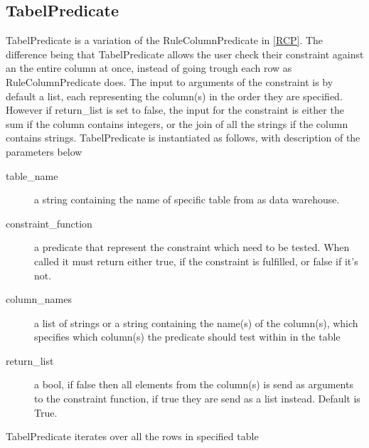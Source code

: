 \subsection{TabelPredicate}
TabelPredicate is a variation of the RuleColumnPredicate in \cref{RCP}. The difference being that TabelPredicate allows the user check their constraint against an the entire column at once, instead of going trough each row as RuleColumnPredicate does. The input to arguments of the constraint is by default a list, each representing the column(s) in the order they are specified. However if return\_list is set to false, the input for the constraint is either the sum if the column contains integers, or the join of all the strings if the column contains strings. TabelPredicate is instantiated as follows, with description of the parameters below


\begin{description}
\item [table\_name] a string containing the name of specific table from as data warehouse. 
\item [constraint\_function] a predicate that represent the constraint which need to be tested. When called it must return either true, if the constraint is fulfilled, or false if it's not.
\item [column\_names] a list of strings or a string containing the name(s) of the column(s), which specifies which column(s) the predicate should test within in the table
\item [return\_list] a bool, if false then all elements from the column(s) is send as arguments to the constraint function, if true they are send as a list instead. Default is True.
\end{description}

TabelPredicate iterates over all the rows in specified table
